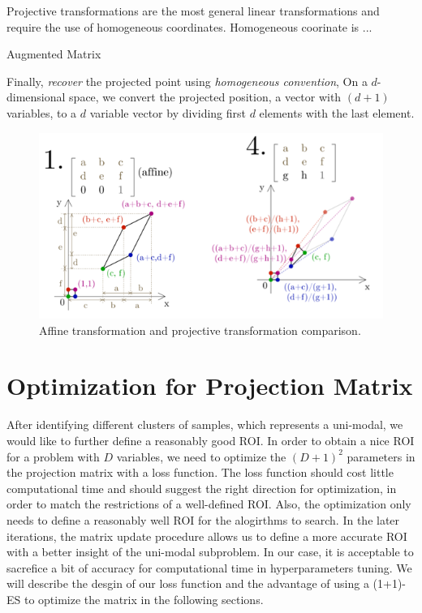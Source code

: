 Projective transformations are the most general linear transformations and require the use of homogeneous coordinates.
Homogeneous coorinate is ...

Augmented Matrix

Finally, \textit{recover} the projected point using \textit{homogeneous convention}, 
On a $d$-dimensional space, we convert the projected position, a vector with $(d+1)$ variables, to a $d$ variable vector 
by dividing first $d$ elements with the last element.

\begin{figure}
\centering
\includegraphics[width=\textwidth]{Affine_vs_Projective}
\caption{Affine transformation and projective transformation comparison.}\label{fig:Affine_vs_Projective}
\end{figure}









\section{Optimization for Projection Matrix}

After identifying different clusters of samples, which represents a uni-modal, 
we would like to further define a reasonably good ROI.
In order to obtain a nice ROI for a problem with $D$ variables, 
we need to optimize the $(D+1)^2$ parameters in the projection matrix with a loss function.
The loss function should cost little computational time and should suggest the right direction for optimization, 
in order to match the restrictions of a well-defined ROI.
Also, the optimization only needs to define a reasonably well ROI for the alogirthms to search.  
In the later iterations, the matrix update procedure allows us to define a more accurate ROI with a better insight of the uni-modal subproblem.
In our case, it is acceptable to sacrefice a bit of accuracy for computational time in hyperparameters tuning.  
We will describe the desgin of our loss function and the advantage of using a (1+1)-ES to optimize the matrix in the following sections.  


